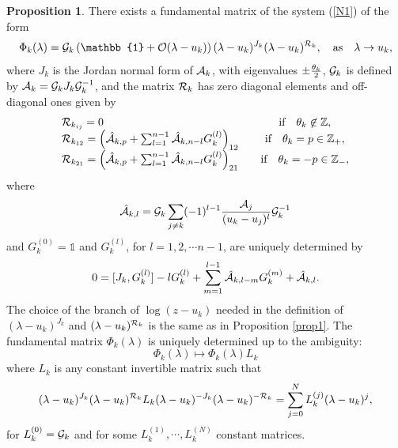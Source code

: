 \documentclass[12pt]{article}
\newcommand{\ID}{\mathbb{1}}
\newcommand {\interi}{\mathbb Z}
\theoremstyle{definition}
\theoremstyle{theorem}
\newtheorem{prop}[df]{Proposition}
\begin{document}
\begin{prop}
There exists a fundamental matrix of the system 
(\ref{N1}) of the form
\begin{equation}
\Phi_k(\lambda)={\cal G}_k\left(\ID +{\cal O}(\lambda-u_k)\right) 
(\lambda-u_k)^{J_k}(\lambda-u_k)^{{\cal R}_k},\quad\hbox{as}\quad 
\lambda\rightarrow u_k,
\label{N6.1}
\end{equation}
where $J_k$ is the Jordan normal form of ${\cal A}_k$, with
eigenvalues $\pm{\theta_k\over2}$, ${\cal G}_k$ is 
defined by ${\cal A}_k={\cal G}_k J_k {\cal G}_k^{-1}$, and the matrix
${\cal R}_k$ has zero diagonal elements and off-diagonal ones given by
\begin{equation}\begin{array}{lc}
{\cal R}_{k_{ij}} = 0 &\quad \hbox{if}\quad
\theta_k\not\in\interi,\\
{\cal R}_{k_{12}} = \left ( \hat{\cal A}_{k,p}+
\sum_{l=1}^{n-1}\hat {\cal A}_{k,n-l} G_k^{(l)}\right)_{12}
&\quad \hbox{if}\quad
\theta_k=p\in\interi_+,\\
{\cal R}_{k_{21}} = \left ( \hat{\cal A}_{k,p}+
\sum_{l=1}^{n-1}\hat {\cal A}_{k,n-l} G_k^{(l)}\right)_{21}
&\quad \hbox{if}\quad
\theta_k=-p\in\interi_-,\\ \end{array}
\end{equation}
where 
\begin{equation}
\hat {\cal A}_{k,l}= {{\cal G}}_k \sum_{j\neq k} (-1)^{l-1} 
{{\cal A}_j\over(u_k-u_j)^{l}}{{\cal G}}_k^{-1}
\end{equation}
and  $G_k^{(0)}=\ID$ and $G_k^{(l)}$, for $l=1,2,\cdots n-1$,  are 
uniquely determined by
\begin{equation}
0= [J_k, G_k^{(l)}] -l G_k^{(l)}+
\sum_{m=1}^{l-1}\hat {\cal A}_{k,l-m} G_k^{(m)} + \hat {\cal A}_{k,l}.
\end{equation}
The choice of the branch of $\log(z-u_k)$ needed in the definition of
$(\lambda-u_k)^{J_k}$ and $(\lambda-u_k)^{{\cal R}_k}$ is the same as
in Proposition \ref{prop1}. The fundamental matrix $\Phi_k(\lambda)$ 
is uniquely determined up to the ambiguity:
\begin{equation}
\Phi_k(\lambda)\mapsto \Phi_k(\lambda)L_k
\end{equation}
where $L_k$ is any constant invertible matrix such that 
\begin{equation}
(\lambda-u_k)^{J_k}(\lambda-u_k)^{{\cal R}_k}L_k
(\lambda-u_k)^{-J_k}(\lambda-u_k)^{-{\cal R}_k}=
\sum_{j=0}^N {L_k^{(j)}(\lambda-u_k)^j},\label{amb5}
\end{equation}
for $L_k^{(0)}={\cal G}_k$ and for some $L_k^{(1)},\cdots,L_k^{(N)}$ constant
matrices.
\label{prop2}
\end{prop}
\end{document}
